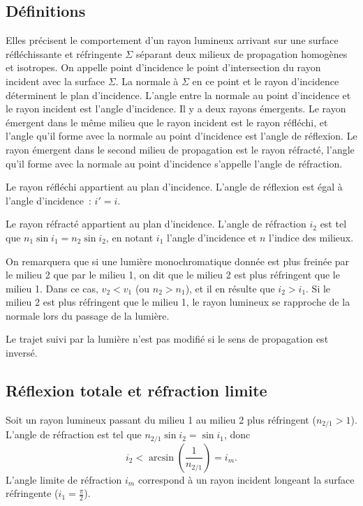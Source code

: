 \subsection{Définitions}\label{chap6-subsec:définitions}
%
Elles précisent le comportement d'un rayon lumineux arrivant sur une surface réfléchissante et réfringente \(\Sigma\) séparant deux milieux de propagation homogènes et isotropes. On appelle point d'incidence le point d'intersection du rayon incident avec la surface \(\Sigma\). La normale à \(\Sigma\) en ce point et le rayon d'incidence déterminent le plan d'incidence. L'angle entre la normale au point d'incidence et le rayon incident est l'angle d'incidence. Il y a deux rayons émergents. Le rayon émergent dans le même milieu que le rayon incident est le rayon réfléchi, et l'angle qu'il forme avec la normale au point d'incidence est l'angle de réflexion. Le rayon émergent dans le second milieu de propagation est le rayon réfracté, l'angle qu'il forme avec la normale au point d'incidence s'appelle l'angle de réfraction.
%
\begin{theo}
  Le rayon réfléchi appartient au plan d'incidence. L'angle de réflexion est égal à l'angle d'incidence~: \(i'=i\).
\end{theo}
\begin{theo}
  Le rayon réfracté appartient au plan d'incidence. L'angle de réfraction \(i_2\) est tel que \(n_1 \sin i_1 = n_2 \sin i_2\), en notant \(i_1\) l'angle d'incidence et \(n\) l'indice des milieux.
\end{theo}
%
On remarquera que si une lumière monochromatique donnée est plus freinée par le milieu 2 que par le milieu 1, on dit que le milieu 2 est plus réfringent que le milieu 1. Dans ce cas, \(v_2 < v_1\) (ou \(n_2 > n_1\)), et il en résulte que \(i_2 > i_1\). Si le milieu 2 est plus réfringent que le milieu 1, le rayon lumineux se rapproche de la normale lors du passage de la lumière.
%
\begin{theo}
  Le trajet suivi par la lumière n'est pas modifié si le sens de propagation est inversé.
\end{theo}
%
\subsection{Réflexion totale et réfraction limite}\label{chap6-subsec:reftotale}
%
Soit un rayon lumineux passant du milieu 1 au milieu 2 plus réfringent (\(n_{2/1}>1\)). L'angle de réfraction est tel que \(n_{2/1} \sin i_2 = \sin i_1\), donc
\begin{equation}
  i_2 < \arcsin \left(\frac{1}{n_{2/1}} \right) = i_m.
\end{equation}
L'angle limite de réfraction \(i_m\) correspond à un rayon incident longeant la surface réfringente (\(i_1 = \frac{\pi}{2}\)).

